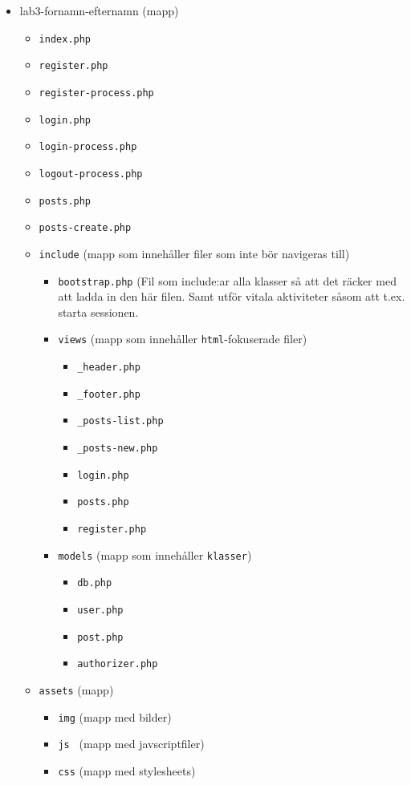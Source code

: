 \documentclass[12pt]{article}
\begin{document}
  \begin{itemize}
    \item lab3-fornamn-efternamn (mapp)
    \begin{itemize}
      \item \texttt{index.php}
      \item \texttt{register.php}
      \item \texttt{register-process.php}
      \item \texttt{login.php}
      \item \texttt{login-process.php}
      \item \texttt{logout-process.php}
      \item \texttt{posts.php}
      \item \texttt{posts-create.php}
      \item \texttt{include} (mapp som innehåller filer som inte bör navigeras till)
      \begin{itemize}
        \item \texttt{bootstrap.php} (Fil som include:ar alla klasser så att det räcker med att ladda in den här filen. Samt utför vitala aktiviteter såsom att t.ex. starta sessionen.
        \item \texttt{views} (mapp som innehåller \texttt{html}-fokuserade filer)
        \begin{itemize}
          \item \texttt{\_header.php}
          \item \texttt{\_footer.php}
          \item \texttt{\_posts-list.php}
          \item \texttt{\_posts-new.php}
          \item \texttt{login.php}
          \item \texttt{posts.php}
          \item \texttt{register.php}
        \end{itemize}
        \item \texttt{models} (mapp som innehåller \texttt{klasser})
        \begin{itemize}
          \item \texttt{db.php}
          \item \texttt{user.php}
          \item \texttt{post.php}
          \item \texttt{authorizer.php}
        \end{itemize}
      \end{itemize}
      \item \texttt{assets} (mapp)
      \begin{itemize}
        \item \texttt{img} (mapp med bilder)
        \item \texttt{js  } (mapp med javscriptfiler)
        \item \texttt{css} (mapp med stylesheets)
      \end{itemize}
    \end{itemize}
  \end{itemize}
\end{document}
